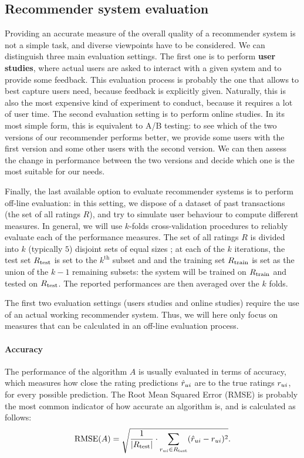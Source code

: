 \subsection{Recommender system evaluation}
\label{SEC:Recommender_system_evaluation}
Providing an accurate measure of the overall quality of a recommender system is
not a simple task, and diverse viewpoints have to be considered.
We can distinguish three main evaluation settings. The first one is to perform
\textbf{user studies}, where actual users are asked to interact with a given system and to
provide some feedback. This evaluation process is probably the one that allows
to best capture users need, because feedback is explicitly given. Naturally,
this is also the most expensive kind of experiment to conduct, because it
requires a lot of user time. The second evaluation setting is to perform online
studies. In its most simple form, this is equivalent to A/B testing: to see
which of the two versions of our recommender performs better, we provide some
users with the first version and some other users with the second version. We
can then assess the change in performance between the two versions and decide
which one is the most suitable for our needs.

Finally, the last available option to evaluate recommender systems is to
perform off-line evaluation: in this setting, we dispose of a dataset of past
transactions (the set of all ratings $R$), and try to simulate user behaviour
to compute different measures.  In general, we will use $k$-folds
cross-validation procedures to reliably evaluate each of the performance
measures. The set of all ratings $R$ is divided into $k$ (typically $5$)
disjoint sets of equal sizes ; at each of the $k$ iterations, the test set
$R_{\text{test}}$ is set to the $k^{\text{th}}$ subset and and the training set
$R_{\text{train}}$ is set as the union of the $k - 1$ remaining subsets: the system will
be trained on $R_{\text{train}}$ and tested on $R_{\text{test}}$. The reported performances are
then averaged over the $k$ folds.

The first two evaluation settings (users studies and online studies) require
the use of an actual working recommender system. Thus, we will here only focus
on measures that can be calculated in an off-line evaluation process.

\paragraph{Accuracy\\}
The performance of the algorithm $A$ is usually evaluated in terms of accuracy,
which measures how close the rating predictions $\hat{r}_{ui}$ are to the true
ratings $r_{ui}$, for every possible prediction. The Root Mean Squared Error
(RMSE) is probably the most common indicator of how accurate an algorithm is,
and is calculated as follows:
$$\text{RMSE}(A) = \sqrt{\frac{1}{|R_{\text{test}}|} \cdot \sum_{r_{ui} \in
R_{\text{test}}}(\hat{r}_{ui} - r_{ui})^2}.$$

